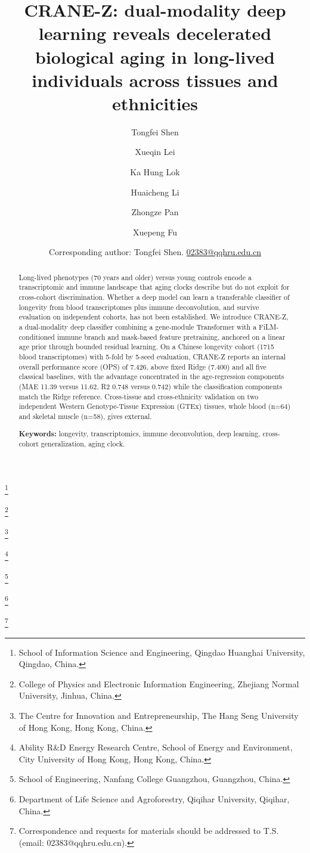 \documentclass[11pt,a4paper]{article}
\begin{document}
\title[CRANE-Z Longevity Classifier]{CRANE-Z: dual-modality deep learning reveals decelerated biological aging in long-lived individuals across tissues and ethnicities}





















\begin{abstract}
Long-lived phenotypes (70 years and older) versus young controls encode a transcriptomic and immune landscape that aging clocks describe but do not exploit for cross-cohort discrimination. Whether a deep model can learn a transferable classifier of longevity from blood transcriptomes plus immune deconvolution, and survive evaluation on independent cohorts, has not been established. We introduce CRANE-Z, a dual-modality deep classifier combining a gene-module Transformer with a FiLM-conditioned immune branch and mask-based feature pretraining, anchored on a linear age prior through bounded residual learning. On a Chinese longevity cohort (1715 blood transcriptomes) with 5-fold by 5-seed evaluation, CRANE-Z reports an internal overall performance score (OPS) of 7.426, above fixed Ridge (7.400) and all five classical baselines, with the advantage concentrated in the age-regression components (MAE 11.39 versus 11.62, R2 0.748 versus 0.742) while the classification components match the Ridge reference. Cross-tissue and cross-ethnicity validation on two independent Western Genotype-Tissue Expression (GTEx) tissues, whole blood (n=64) and skeletal muscle (n=58), gives external.

\textbf{Keywords:} longevity, transcriptomics, immune deconvolution, deep learning, cross-cohort generalization, aging clock.
\end{abstract}

\author{Tongfei Shen}
\thanks{School of Information Science and Engineering, Qingdao Huanghai University, Qingdao, China.}
\author{Xueqin Lei}
\thanks{College of Physics and Electronic Information Engineering, Zhejiang Normal University, Jinhua, China.}
\author{Ka Hung Lok}
\thanks{The Centre for Innovation and Entrepreneurship, The Hang Seng University of Hong Kong, Hong Kong, China.}
\author{Huaicheng Li}
\thanks{Ability R\&D Energy Research Centre, School of Energy and Environment, City University of Hong Kong, Hong Kong, China.}
\author{Zhongze Pan}
\thanks{School of Engineering, Nanfang College Guangzhou, Guangzhou, China.}
\author{Xuepeng Fu}
\thanks{Department of Life Science and Agroforestry, Qiqihar University, Qiqihar, China.}
\author{Corresponding author: Tongfei Shen. \href{mailto:02383@qqhru.edu.cn}{02383@qqhru.edu.cn}}
\thanks{Correspondence and requests for materials should be addressed to T.S. (email: 02383@qqhru.edu.cn).}
\maketitle
\end{document}
